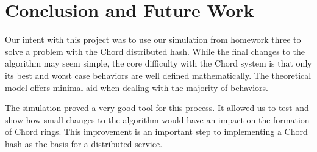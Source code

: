 \documentclass[12pt]{ieeetran} %
\begin{document}
\section{Conclusion and Future Work}

Our intent with this project was to use our simulation from homework three to solve a problem with the Chord distributed hash. While the final changes to the algorithm may seem simple, the core difficulty with the Chord system is that only its best and worst case behaviors are well defined mathematically. The theoretical model offers minimal aid when dealing with the majority of behaviors. 

The simulation proved a very good tool for this process. It allowed us to test and show how small changes to the algorithm would have an impact on the formation of Chord rings. This improvement is an important step to implementing a Chord hash as the basis for a distributed service.











\end{document}
